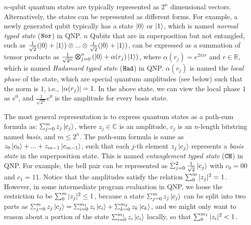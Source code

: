 $n$-qubit quantum states are typically represented as $2^n$ dimensional vectors. Alternatively, the states can be represented as different forms. For example, a newly generated qubit typically has a state $\left\vert{0}\right\rangle$ or $\left\vert{1}\right\rangle$, which is named \textit{normal typed state} ($\texttt{Nor}$) in QNP. $n$ Qubits that are in superposition but not entangled, such as $\frac{1}{\sqrt{2}}(\left\vert{0}\right\rangle + \left\vert{1}\right\rangle)\otimes ... \otimes \frac{1}{\sqrt{2}}(\left\vert{0}\right\rangle + \left\vert{1}\right\rangle)$, can be expressed as a summation of tensor products as $\shad{2^n}{n}{\alpha(r_j)}$, where $\alpha(r_j)=e^{2\pi i r}$ and $r \in \mathbb{R}$, which is named \textit{Hadamard typed state} ($\texttt{Had}$) in QNP.
$\alpha(r_j)$ is named the \emph{local phase} of the state, which are special quantum amplitudes (see below) such that the norm is $1$, i.e., $|\alpha(r_j)|=1$. In the above state, we can view the local phase $1$ as $e^{0}$, and $\frac{1}{\sqrt{2^n}}e^{0}$ is the amplitude for every basis state.

The most general representation is to express quantum states as a path-sum formula as: $\sch{m}{z_j}{c_j}$, where $z_j\in \mathbb{C}$ is an amplitude, $c_j$ is an $n$-length bitstring named \emph{basis}, and $m \le 2^n$. The path-sum formula is same as ${z_0}\left\vert{c_0}\right\rangle+...+{z_{m-1}}\left\vert{c_{m-1}}\right\rangle$, such that each $j$-th element ${z_j}\left\vert{c_j}\right\rangle$ represents a \emph{basis state} in the superposition state. 
This is named \textit{entanglement typed state} ($\texttt{CH}$) in QNP.
For example, the bell pair can be represented as $\sch{2}{\frac{1}{\sqrt{2}}}{c_j}$ with $c_0=00$ and $c_1=11$.
Notice that the amplitudes satisfy the relation $\sum_{0}^{m}|z_j|^2 = 1$. However, in some intermediate program evaluation in QNP, we loose the restriction to be $\sum_{0}^{m}|z_j|^2 \le 1$, because a state $\sch{m}{z_j}{c_j}$ can be split into two parts as $\sch{m}{z_j}{c_j}=\schii{m_1}{z_i}{c_i}+\schk{m_2}{z_k}{c_k}$, and we might only want to reason about a portion of the state $\schii{m_1}{z_i}{c_i}$ locally, so that $\sum_{0}^{m_1}|z_i|^2 < 1$. 

